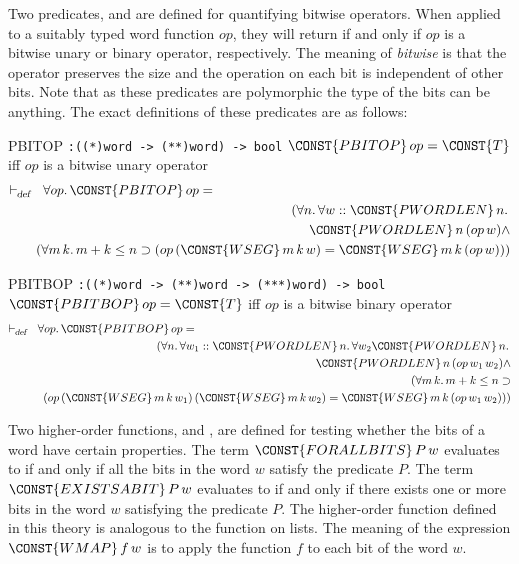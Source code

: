 Two predicates,  and  are defined for
quantifying bitwise operators.
When applied to a suitably typed word function $op$, they will return
 if and only if $op$ is a bitwise unary or binary operator,
respectively. The meaning of {\it bitwise\/} is that the operator
preserves the size and the operation on each bit is independent of
other bits. Note that as these predicates are polymorphic
the type of the bits can be anything. The exact definitions of these
predicates are as follows:
\begin{constants}
\item[PBITOP]\verb":((*)word -> (**)word) -> bool" \newline
        $\CONST{PBITOP} \,op = \CONST{T}$ iff $op$ is a bitwise unary operator
\begin{eqnarray*}
\lefteqn{\DEF \FORALL op\DOT \CONST{PBITOP} \,op =} \\
 & & {} (\FORALL n\DOT \FORALL w :: \CONST{PWORDLEN} \,n\DOT \\
 & & \quad \CONST{PWORDLEN} \,n \,(op \,w) \AND \\
 & & \quad (\FORALL m \,k\DOT m + k \LEE  n \IMP
           (op \,(\CONST{WSEG} \,m \,k \,w) = \CONST{WSEG} \,m \,k \,(op \,w)))
\end{eqnarray*}
\item[PBITBOP]\verb":((*)word -> (**)word -> (***)word) -> bool" \newline
        $\CONST{PBITBOP} \,op = \CONST{T}$ iff $op$ is a bitwise binary operator
\begin{eqnarray*}
\lefteqn{\DEF \FORALL op\DOT \CONST{PBITBOP} \,op =} \\
 & & {} (\FORALL n\DOT \FORALL w_1 :: \CONST{PWORDLEN} \,n\DOT
         \FORALL w_2 \CONST{PWORDLEN} \,n\DOT \\
 & & \quad \CONST{PWORDLEN} \,n \,(op \,w_{1} \,w_{2}) \AND \\
 & & \quad (\FORALL m \,k\DOT m + k \LEE  n \IMP \\
 & & \qquad (op \,(\CONST{WSEG} \,m \,k \,w_{1}) \,(\CONST{WSEG} \,m \,k \,w_{2}) =
        \CONST{WSEG} \,m \,k \,(op \,w_{1} \,w_{2})))
\end{eqnarray*}
\end{constants}

Two higher-order functions,  and ,
are defined for testing whether the bits of a word have certain
properties. The term $\CONST{FORALLBITS}\, P\,w$ evaluates to
 if and only if all the bits in the word $w$ satisfy the
predicate $P$. The term $\CONST{EXISTSABIT}\, P\,w$ evaluates to
 if and only if there exists one or more bits in the word $w$
satisfying the
predicate $P$. The higher-order function  defined in
this theory is analogous to the function  on lists. The
meaning of the expression $\CONST{WMAP}\, f\,w$ is to apply the
function $f$ to each bit of the word $w$.

